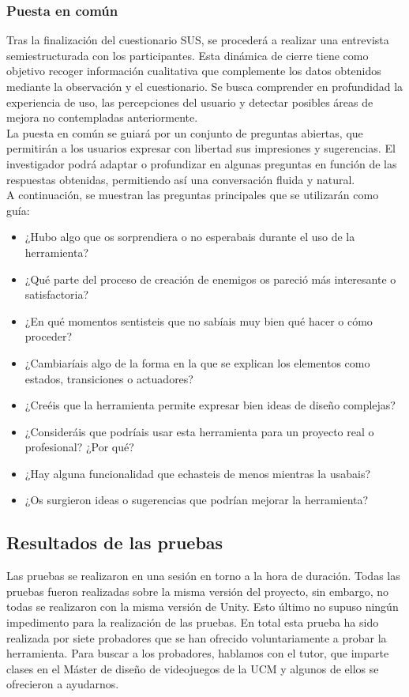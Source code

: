\subsubsection{Puesta en común}
Tras la finalización del cuestionario SUS, se procederá a realizar una entrevista semiestructurada con los participantes. Esta dinámica de cierre tiene como objetivo recoger información cualitativa que complemente los datos obtenidos mediante la observación y el cuestionario. Se busca comprender en profundidad la experiencia de uso, las percepciones del usuario y detectar posibles áreas de mejora no contempladas anteriormente.\\

La puesta en común se guiará por un conjunto de preguntas abiertas, que permitirán a los usuarios expresar con libertad sus impresiones y sugerencias. El investigador podrá adaptar o profundizar en algunas preguntas en función de las respuestas obtenidas, permitiendo así una conversación fluida y natural.\\

A continuación, se muestran las preguntas principales que se utilizarán como guía:

\begin{itemize}
\item ¿Hubo algo que os sorprendiera o no esperabais durante el uso de la herramienta?
\item ¿Qué parte del proceso de creación de enemigos os pareció más interesante o satisfactoria?
\item ¿En qué momentos sentisteis que no sabíais muy bien qué hacer o cómo proceder?
\item ¿Cambiaríais algo de la forma en la que se explican los elementos como estados, transiciones o actuadores?
\item ¿Creéis que la herramienta permite expresar bien ideas de diseño complejas?
\item ¿Consideráis que podríais usar esta herramienta para un proyecto real o profesional? ¿Por qué?
\item ¿Hay alguna funcionalidad que echasteis de menos mientras la usabais?
\item ¿Os surgieron ideas o sugerencias que podrían mejorar la herramienta?
\end{itemize}

\subsection{Resultados de las pruebas}
Las pruebas se realizaron en una sesión en torno a la hora de duración. Todas las pruebas fueron realizadas sobre la misma versión del proyecto, sin embargo, no todas se realizaron con la misma versión de Unity. Esto último no supuso ningún impedimento para la realización de las pruebas. 
En total esta prueba ha sido realizada por siete probadores que se han ofrecido voluntariamente a probar la herramienta. Para buscar a los probadores, hablamos con el tutor, que imparte clases en el Máster de diseño de videojuegos de la UCM y algunos de ellos se ofrecieron a ayudarnos. \\

